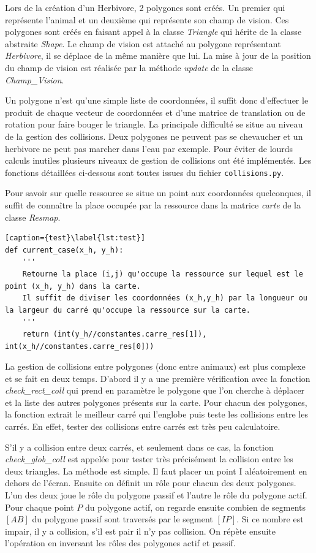 \documentclass[a4paper,11pt,final,oneside]{article}
\begin{document}
Lors de la création d'un Herbivore, 2 polygones sont créés. Un premier qui représente l'animal et un deuxième qui représente son champ de vision. Ces polygones sont créés en faisant appel à la classe \textit{Triangle} qui  hérite de la classe abstraite \textit{Shape}. Le champ de vision est attaché au polygone représentant \textit{Herbivore}, il se déplace de la même manière que lui. La mise à jour de la position du champ de vision est réalisée par la méthode \textit{update} de la classe \textit{Champ\_Vision}. 

Un polygone n'est qu'une simple liste de coordonnées, il suffit donc d'effectuer le produit de chaque vecteur de coordonnées et d'une matrice de translation ou de rotation pour faire bouger le triangle. La principale difficulté se situe au niveau de la gestion des collisions. Deux polygones ne peuvent pas se chevaucher et un herbivore ne peut pas marcher dans l'eau par exemple. Pour éviter de lourds calculs inutiles plusieurs niveaux de gestion de collisions ont été implémentés. Les fonctions détaillées ci-dessous sont toutes issues du fichier \texttt{collisions.py}.


Pour savoir sur quelle ressource se situe un point aux coordonnées quelconques, il suffit de connaître la place occupée par la ressource dans la matrice \textit{carte} de la classe \textit{Resmap}.

\begin{lstlisting}[caption={test}\label{lst:test}]
def current_case(x_h, y_h):
	'''
	Retourne la place (i,j) qu'occupe la ressource sur lequel est le point (x_h, y_h) dans la carte.
	Il suffit de diviser les coordonnées (x_h,y_h) par la longueur ou la largeur du carré qu'occupe la ressource sur la carte.
	''' 
    return (int(y_h//constantes.carre_res[1]), int(x_h//constantes.carre_res[0]))
\end{lstlisting}

La gestion de collisions entre polygones (donc entre animaux) est plus complexe et se fait en deux temps. D'abord il y a une première vérification avec la fonction \textit{check\_rect\_coll} qui prend en paramètre le polygone que l'on cherche à déplacer et la liste des autres polygones présents sur la carte. Pour chacun des polygones, la fonction extrait le meilleur carré qui l'englobe puis teste les collisions entre les carrés. En effet, tester des collisions entre carrés est très peu calculatoire.

S'il y a collision entre deux carrés, et seulement dans ce cas, la fonction\\ \textit{check\_glob\_coll} est appelée pour tester très précisément la collision entre les deux triangles. La méthode est simple. Il faut placer un point I aléatoirement en dehors de l'écran. Ensuite on définit un rôle pour chacun des deux polygones. L'un des deux joue le rôle du polygone passif et l'autre le rôle du polygone actif. Pour chaque point $P$ du polygone actif, on regarde ensuite combien de segments $[AB]$ du polygone passif sont traversés par le segment $[IP]$. Si ce nombre est impair, il y a collision, s'il est pair il n'y pas collision. On répète ensuite l'opération en inversant les rôles des polygones actif et passif. 
\end{document}
